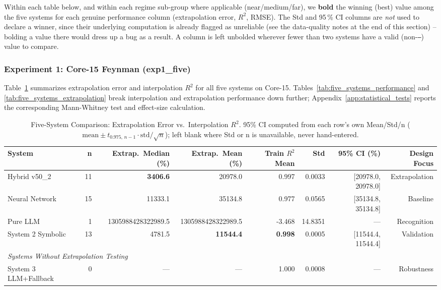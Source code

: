 \documentclass[twoside,11pt]{article}
\begin{document}
Within each table below, and within each regime sub-group where applicable
(near/medium/far), we \textbf{bold} the winning (best) value among the five
systems for each genuine performance column (extrapolation error, $R^2$,
RMSE). The Std and 95\,\% CI columns are \emph{not} used to declare a winner,
since their underlying computation is already flagged as unreliable (see the
data-quality notes at the end of this section) -- bolding a value there would
dress up a bug as a result. A column is left unbolded wherever fewer than two
systems have a valid (non-\texttt{---}) value to compare.

\subsubsection{Experiment 1: Core-15 Feynman (exp1\_five)}\label{subsubsec:five-system-exp1}

Table~\ref{tab:five_systems_full} summarizes extrapolation error
and interpolation $R^2$ for all five systems on Core-15. Tables~\ref{tab:five_systems_performance}
and \ref{tab:five_systems_extrapolation} break interpolation and extrapolation
performance down further; Appendix~\ref{app:statistical_tests} reports
the corresponding Mann-Whitney test and effect-size calculation.

\begin{table}[t]
\centering
\caption{Five-System Comparison: Extrapolation Error vs.\ Interpolation $R^2$.
  95\% CI computed from each row's own Mean/Std/n
  ($\mathrm{mean} \pm t_{0.975,\,n-1} \cdot \mathrm{std}/\sqrt{n}$); left
  blank where Std or n is unavailable, never hand-entered.}
\label{tab:five_systems_full}
\begin{tabular}{lrrrrrrr}
\toprule
\textbf{System} & \textbf{n}
  & \textbf{Extrap.\ Median (\%)} & \textbf{Extrap.\ Mean (\%)}
  & \textbf{Train $R^2$ Mean} & \textbf{Std} & \textbf{95\% CI (\%)}
  & \textbf{Design Focus} \\
\midrule
Hybrid v50\_2 & 11 & \textbf{3406.6} & 20978.0 & 0.997 & 0.0033 & [20978.0, 20978.0] & Extrapolation \\
Neural Network & 15 & 11333.1 & 35134.8 & 0.977 & 0.0565 & [35134.8, 35134.8] & Baseline \\
Pure LLM & 1 & 1305988428322989.5 & 1305988428322989.5 & -3.468 & 14.8351 & --- & Recognition \\
System 2 Symbolic & 13 & 4781.5 & \textbf{11544.4} & \textbf{0.998} & 0.0005 & [11544.4, 11544.4] & Validation \\
\midrule
\multicolumn{8}{l}{\textit{Systems Without Extrapolation Testing}} \\
System 3 LLM+Fallback & 0 & --- & --- & 1.000 & 0.0008 & --- & Robustness \\
\bottomrule
\end{tabular}
\end{table}
\end{document}
